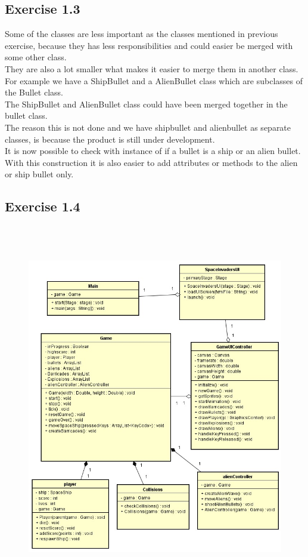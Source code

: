 \documentclass[10pt]{article}
\begin{document}
 \subsection{Exercise 1.3} 
Some of the classes are less important as the classes mentioned in previous exercise, because they has less responsibilities and could easier be merged with some other class.\\
They are also a lot smaller what makes it easier to merge them in another class. For example we have a ShipBullet and a AlienBullet class which are subclasses of the Bullet class. \\
 The ShipBullet and AlienBullet class could have been merged together in the bullet class. \\
The reason this is not done and we have shipbullet and alienbullet as separate classes, is because the product is still under development. \\
It is now possible to check with instance of if a bullet is a ship or an alien bullet. \\
With this construction it is also easier to add attributes or methods to the alien or ship bullet only.\\
 \pagebreak

 \subsection{Exercise 1.4} 
\begin{figure}[ht!]
\centering
\includegraphics[width=14cm, height=16cm]{UMLSEM.jpg}
\end{figure}
\end{document}
